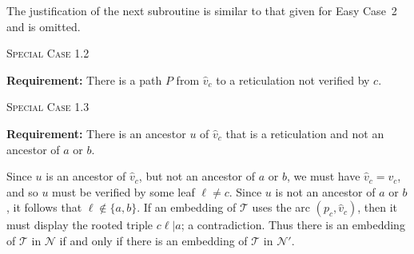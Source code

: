 \documentclass[11pt]{amsart}
\begin{document}
The justification of the next subroutine is similar to that given for {\sc Easy Case~2} and is omitted.

\begin{algorithm}[H]
 \caption{\textsc{Special Case 1.2}}
\begin{algorithmic}[1]
 \Statex\textbf{Requirement:} There is a path $P$ from $\hat v_c$ to a reticulation not verified by $c$.
 \end{algorithmic}
\end{algorithm}

\begin{algorithm}[H]
 \caption{\textsc{Special Case 1.3}}
\begin{algorithmic}[1]
 \Statex\textbf{Requirement:} There is an ancestor $u$ of $\hat v_c$ that is a reticulation and not an ancestor of $a$ or $b$.
 \end{algorithmic}
\end{algorithm}
Since $u$ is an ancestor of $\hat v_c$, but not an ancestor of $a$ or $b$, we must have $\hat v_c=v_c$, and so $u$ must be verified by some leaf $\ell\neq c$. Since $u$ is not an ancestor of $a$ or $b$, it follows that $\ell\not\in \{a, b\}$. If an embedding of ${{\mathcal T}}$ uses the arc $(p_c,\hat v_c)$, then it must display the rooted triple $c\ell|a$; a contradiction. Thus there is an embedding of ${{\mathcal T}}$ in ${{\mathcal N}}$ if and only if there is an embedding of ${{\mathcal T}}$ in ${{\mathcal N}}'$.
\end{document}
